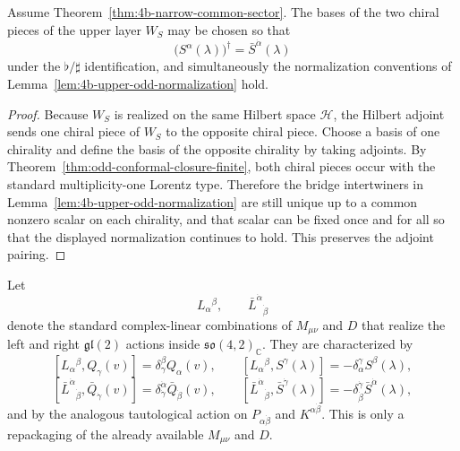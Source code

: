 \begin{lemma}
\label{lem:4b-upper-odd-adjoint-choice}
Assume Theorem~\ref{thm:4b-narrow-common-sector}. The bases of the two chiral
pieces of the upper layer \(W_S\) may be chosen so that
\[
\bigl(S^\alpha(\lambda)\bigr)^\dagger=\bar S^{\dot\alpha}(\lambda)
\]
under the \(\flat/\sharp\) identification, and simultaneously the normalization
conventions of Lemma~\ref{lem:4b-upper-odd-normalization} hold.
\end{lemma}

\begin{proof}
Because \(W_S\) is realized on the same Hilbert space \(\mathcal H\), the Hilbert
adjoint sends one chiral piece of \(W_S\) to the opposite chiral piece. Choose a
basis of one chirality and define the basis of the opposite chirality by taking
adjoints. By Theorem~\ref{thm:odd-conformal-closure-finite}, both chiral pieces
occur with the standard multiplicity-one Lorentz type. Therefore the bridge
intertwiners in Lemma~\ref{lem:4b-upper-odd-normalization} are still unique up to a
common nonzero scalar on each chirality, and that scalar can be fixed once and for
all so that the displayed normalization continues to hold. This preserves the
adjoint pairing.
\end{proof}

\begin{definition}
\label{def:4b-degree-zero-generators}
Let
\[
  L_\alpha{}^\beta,
  \qquad
  \bar L^{\dot\alpha}{}_{\dot\beta}
\]
denote the standard complex-linear combinations of \(M_{\mu\nu}\) and \(D\) that
realize the left and right \(\mathfrak{gl}(2)\) actions inside
\(\mathfrak{so}(4,2)_\mathbb C\). They are characterized by
\[
  [L_\alpha{}^\beta,Q_\gamma(v)]
  =
  \delta_\gamma^\beta Q_\alpha(v),
  \qquad
  [L_\alpha{}^\beta,S^\gamma(\lambda)]
  =
  -\delta_\alpha^\gamma S^\beta(\lambda),
\]
\[
  [\bar L^{\dot\alpha}{}_{\dot\beta},\bar Q_{\dot\gamma}(v)]
  =
  \delta_{\dot\gamma}^{\dot\alpha}\bar Q_{\dot\beta}(v),
  \qquad
  [\bar L^{\dot\alpha}{}_{\dot\beta},\bar S^{\dot\gamma}(\lambda)]
  =
  -\delta_{\dot\beta}^{\dot\gamma}\bar S^{\dot\alpha}(\lambda),
\]
and by the analogous tautological action on \(P_{\alpha\dot\beta}\) and
\(K^{\alpha\dot\beta}\). This is only a repackaging of the already available
\(M_{\mu\nu}\) and \(D\).
\end{definition}

